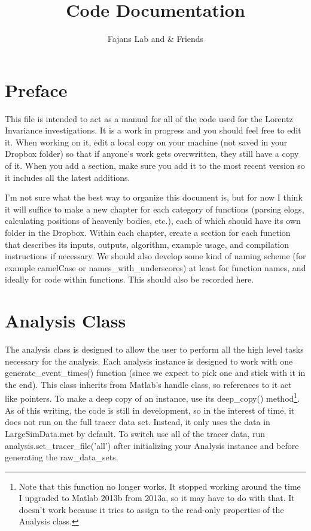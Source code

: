 \documentclass[12pt]{report}
\author{Fajans Lab and \& Friends}
\title{Code Documentation}
\begin{document}
\maketitle

\chapter*{Preface}
This file is intended to act as a manual for all of the code used for the Lorentz Invariance investigations.  It is a work in progress and you should feel free to edit it.  When working on it, edit a local copy on your machine (not saved in your Dropbox folder) so that if anyone's work gets overwritten, they still have a copy of it.  When you add a section, make sure you add it to the most recent version so it includes all the latest additions.

I'm not sure what the best way to organize this document is, but for now I think it will suffice to make a new chapter for each category of functions (parsing elogs, calculating positions of heavenly bodies, etc.), each of which should have its own folder in the Dropbox.  Within each chapter, create a section for each function that describes its inputs, outputs, algorithm, example usage, and compilation instructions if necessary.  We should also develop some kind of naming scheme (for example camelCase or names\_with\_underscores) at least for function names, and ideally for code within functions.  This should also be recorded here.

\tableofcontents



\chapter{Analysis Class}
The analysis class is designed to allow the user to perform all the high level tasks necessary for the analysis.  Each analysis instance is designed to work with one generate\_event\_times() function (since we expect to pick one and stick with it in the end).  This class inherits from Matlab's handle class, so references to it act like pointers.  To make a deep copy of an instance, use its deep\_copy() method\footnote{Note that this function no longer works.  It stopped working around the time I upgraded to Matlab 2013b from 2013a, so it may have to do with that.  It doesn't work because it tries to assign to the read-only properties of the Analysis class.}.  As of this writing, the code is still in development, so in the interest of time, it does not run on the full tracer data set.  Instead, it only uses the data in LargeSimData.met by default.  To switch use all of the tracer data, run analysis.set\_tracer\_file('all') after initializing your Analysis instance and before generating the raw\_data\_sets.
\end{document}
